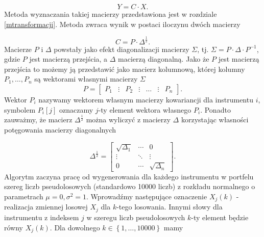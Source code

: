 \documentclass[11pt,titlepage]{article}
\numberwithin{equation}{section}
\begin{document}
\begin{equation}
    Y=C \cdot X.
\end{equation}
Metoda wyznaczania takiej macierzy przedstawiona jest w rozdziale \ref{mtransformacji}. Metoda zwraca wynik w postaci iloczynu dwóch macierzy

\begin{equation}
    C=P \cdot \Delta^{\frac{1}{2}}.
\end{equation}
Macierze $P$ i $\Delta$ powstały jako efekt diagonalizacji macierzy $\Sigma$, tj. $\Sigma=P \cdot \Delta \cdot P^{-1}$, gdzie  $P$ jest macierzą przejścia, a $\Delta$ macierzą diagonalną. Jako że $P$ jest macierzą przejścia to możemy ją przedstawić jako macierz kolumnową, której kolumny $P_1, \hdots, P_n$ są wektorami własnymi macierzy $\Sigma$
\begin{equation}
    P=\begin{bmatrix} P_1 & \vdots & P_2 & \vdots  & \hdots & \vdots & P_n \end{bmatrix}.
\end{equation}
Wektor $P_i$ nazywamy wektorem własnym macierzy kowariancji dla instrumentu $i$, symbolem $P_{i}[j]$ oznaczamy $j$-ty element wektora własnego $P_i$. Ponadto zauważmy, że macierz $\Delta^{\frac{1}{2}}$ można wyliczyć z macierzy $\Delta$ korzystając własności potęgowania macierzy diagonalnych



\begin{equation}
\Delta^{\frac{1}{2}}=\begin{bmatrix} \sqrt{\Delta_1} &  \cdots &0 \\
\vdots & \ddots  & \vdots \\ 0& \cdots & \sqrt{\Delta_n} \end{bmatrix}.
\end{equation} 
Algorytm zaczyna pracę od wygenerowania dla każdego instrumentu w portfelu szereg liczb pseudolosowych (standardowo 10000 liczb) z rozkładu normalnego o parametrach $\mu=0,\sigma^2=1$. Wprowadźmy następujące oznaczenie $X_j(k)$ - realizacja zmiennej losowej $X_j$ dla $k$-tego losowania. Innymi słowy dla instrumentu z indeksem $j$ w szeregu liczb pseudolosowych $k$-ty element będzie równy $X_j(k)$. Dla dowolnego $k \in \left \{1, \hdots, 10000 \right \} $ mamy
\end{document}
